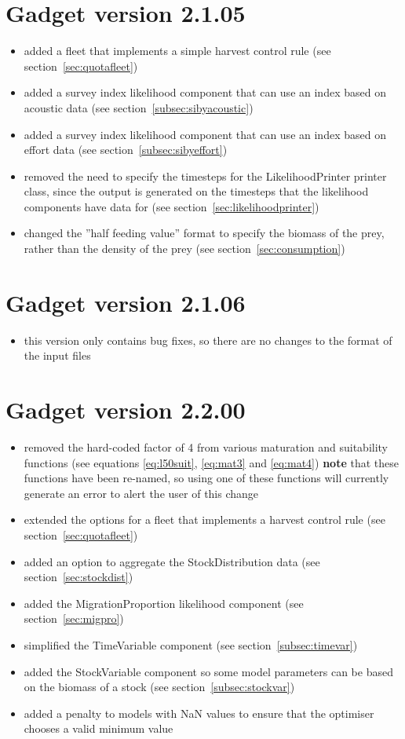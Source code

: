 \documentclass[10pt,twoside]{book}
\begin{document}
\section{Gadget version 2.1.05}\label{sec:v2105}
\begin{itemize}
\item added a fleet that implements a simple harvest control rule (see section~\ref{sec:quotafleet})
\item added a survey index likelihood component that can use an index based on acoustic data (see section~\ref{subsec:sibyacoustic})
\item added a survey index likelihood component that can use an index based on effort data (see section~\ref{subsec:sibyeffort})
\item removed the need to specify the timesteps for the LikelihoodPrinter printer class, since the output is generated on the timesteps that the likelihood components have data for (see section~\ref{sec:likelihoodprinter})
\item changed the ''half feeding value'' format to specify the biomass of the prey, rather than the density of the prey (see section~\ref{sec:consumption})
\end{itemize}

\section{Gadget version 2.1.06}\label{sec:v2106}
\begin{itemize}
\item this version only contains bug fixes, so there are no changes to the format of the input files
\end{itemize}

\section{Gadget version 2.2.00}\label{sec:v2200}
\begin{itemize}
\item removed the hard-coded factor of 4 from various maturation and suitability functions \newline (see equations \ref{eq:l50suit}, \ref{eq:mat3} and \ref{eq:mat4}) {\bf note} that these functions have been re-named, so using one of these functions will currently generate an error to alert the user of this change
\item extended the options for a fleet that implements a harvest control rule (see section~\ref{sec:quotafleet})
\item added an option to aggregate the StockDistribution data (see section~\ref{sec:stockdist})
\item added the MigrationProportion likelihood component (see section~\ref{sec:migpro})
\item simplified the TimeVariable component (see section~\ref{subsec:timevar})
\item added the StockVariable component so some model parameters can be based on the biomass of a stock (see section~\ref{subsec:stockvar})
\item added a penalty to models with NaN values to ensure that the optimiser chooses a valid minimum value
\end{itemize}
\end{document}

